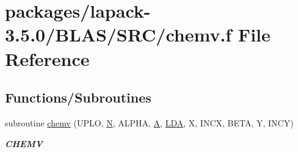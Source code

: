 \hypertarget{lapack-3_85_80_2BLAS_2SRC_2chemv_8f}{}\section{packages/lapack-\/3.5.0/\+B\+L\+A\+S/\+S\+R\+C/chemv.f File Reference}
\label{lapack-3_85_80_2BLAS_2SRC_2chemv_8f}
\subsection*{Functions/\+Subroutines}
\begin{DoxyCompactItemize}
\item 
subroutine \hyperlink{group__complex__blas__level2_gac23d51cad7f51484371119bb6e3fb1f3}{chemv} (U\+P\+L\+O, \hyperlink{polmisc_8c_a0240ac851181b84ac374872dc5434ee4}{N}, A\+L\+P\+H\+A, \hyperlink{classA}{A}, \hyperlink{example__user_8c_ae946da542ce0db94dced19b2ecefd1aa}{L\+D\+A}, X, I\+N\+C\+X, B\+E\+T\+A, Y, I\+N\+C\+Y)
\begin{DoxyCompactList}\small\item\em {\bfseries C\+H\+E\+M\+V} \end{DoxyCompactList}\end{DoxyCompactItemize}
